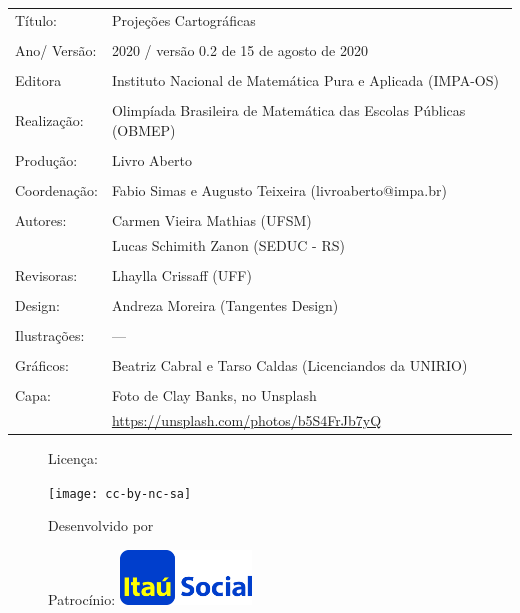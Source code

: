\begin{tabular}{p{}p{}}
Título: & Projeções Cartográficas\\
\\
Ano/ Versão: & 2020 / versão 0.2 de 15 de agosto de 2020\\
\\
Editora & Instituto Nacional de Matem\'atica Pura e Aplicada (IMPA-OS)\\
\\
Realização:& Olimp\'iada Brasileira de Matem\'atica das Escolas P\'ublicas (OBMEP)\\
\\
Produção:& Livro Aberto\\
\\
Coordenação:& Fabio Simas e Augusto Teixeira (livroaberto@impa.br)\\
\\
  Autores: & Carmen Vieira Mathias (UFSM)\\
             & Lucas Schimith Zanon (SEDUC - RS)\\
\\
Revisoras: &  Lhaylla Crissaff (UFF) \\
\\
Design: & Andreza Moreira (Tangentes Design) \\
\\
  Ilustrações: & --- \\ 
\\
Gráficos: & Beatriz Cabral e Tarso Caldas (Licenciandos da UNIRIO)\\
\\
  Capa: & Foto de Clay Banks, no Unsplash \\
  & \url{https://unsplash.com/photos/b5S4FrJb7yQ} \\
\end{tabular}
\vspace{.5cm}


\begin{figure}[b]
\begin{minipage}[l]{5cm}
\centering

{\large Licença:}

  \texttt{[image: cc-by-nc-sa]}
\end{minipage}\hfill
\begin{minipage}[c]{5cm}
\centering
{\large Desenvolvido por}

\end{minipage}
\begin{minipage}[r]{5cm}
\centering

{\large Patrocínio:}
  \vspace{1em}
  \includegraphics[width=3.5cm]{itau}
\end{minipage}
\end{figure}

